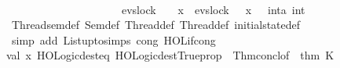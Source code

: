\begin{isabellebody}
\ \ \ \ \ \ \ \ \ \ \ \ \ \ \ \ \ \ \ \ \ {\isacharbar}{\kern0pt}{\isacharbar}{\kern0pt}{\isacharbar}{\kern0pt}\ \isanewline
\ \ \ \ \ \ \ \ \ \ \ \ \ \ \ \ \ \ \ \ \ {\isacharparenleft}{\kern0pt}evs{\isachardot}{\kern0pt}lock\ {}\ {\isasymrightarrow}\ {\isacharparenleft}{\kern0pt}{\isasymmu}\ x{\isachardot}{\kern0pt}\ {\isacharparenleft}{\kern0pt}{\isasymlambda}{\isasymsigma}{\isachardot}{\kern0pt}\ evs{\isachardot}{\kern0pt}lock\ {}\ {\isasymrightarrow}\ x\ {\isasymsigma}{\isacharparenright}{\kern0pt}{\isacharparenright}{\kern0pt}\ {\isacharparenleft}{\kern0pt}{\isacharparenleft}{\kern0pt}{\isasymlambda}{\isacharunderscore}{\kern0pt}{\isachardot}{\kern0pt}\ {}{\isacharcolon}{\kern0pt}{\isacharcolon}{\kern0pt}int{\isacharparenright}{\kern0pt}{\isacharparenleft}{\kern0pt}{\isacharprime}{\kern0pt}{\isacharprime}{\kern0pt}a{\isacharprime}{\kern0pt}{\isacharprime}{\kern0pt}{\isacharcolon}{\kern0pt}{\isacharequal}{\kern0pt}\ {}{\isacharcolon}{\kern0pt}{\isacharcolon}{\kern0pt}int{\isacharparenright}{\kern0pt}{\isacharparenright}{\kern0pt}{\isacharparenright}{\kern0pt}{\isacharparenright}{\kern0pt}\ \isanewline
\ \ \ \ {\isacartoucheclose}\isanewline
%
\isadelimproof
\ \ %
\endisadelimproof
%
\isatagproof
{}\isamarkupfalse%
\ Thread{}{\isacharunderscore}{\kern0pt}sem{\isacharunderscore}{\kern0pt}def\ Sem{\isacharunderscore}{\kern0pt}def\ Thread{}{\isacharunderscore}{\kern0pt}def\ Thread{}{\isacharunderscore}{\kern0pt}def\ initial{\isacharunderscore}{\kern0pt}state{\isacharunderscore}{\kern0pt}def\isanewline
\ \ \isamarkupfalse%
\ {\isacharparenleft}{\kern0pt}simp\ add{\isacharcolon}{\kern0pt}\ List{\isachardot}{\kern0pt}upto{\isachardot}{\kern0pt}simps\ cong{\isacharcolon}{\kern0pt}\ HOL{\isachardot}{\kern0pt}if{\isacharunderscore}{\kern0pt}cong{\isacharparenright}{\kern0pt}%
\endisatagproof
{\isafoldproof}%
%
\isadelimproof
\isanewline
%
\endisadelimproof
\ \ \isanewline
\isanewline
%
\isadelimML
\isanewline
%
\endisadelimML
%
\isatagML
{}\isamarkupfalse%
{\isacartoucheopen}\isanewline
val\ x\ {\isacharequal}{\kern0pt}HOLogic{\isachardot}{\kern0pt}dest{\isacharunderscore}{\kern0pt}eq\ {\isacharparenleft}{\kern0pt}HOLogic{\isachardot}{\kern0pt}dest{\isacharunderscore}{\kern0pt}Trueprop\ {\isacharparenleft}{\kern0pt}\ Thm{\isachardot}{\kern0pt}concl{\isacharunderscore}{\kern0pt}of\ \ {\isacharat}{\kern0pt}{\isacharbraceleft}{\kern0pt}thm\ K{\isacharbraceright}{\kern0pt}{\isacharparenright}{\kern0pt}{\isacharparenright}{\kern0pt}\ {\isacharsemicolon}{\kern0pt}\ \isanewline

\end{isabellebody}

